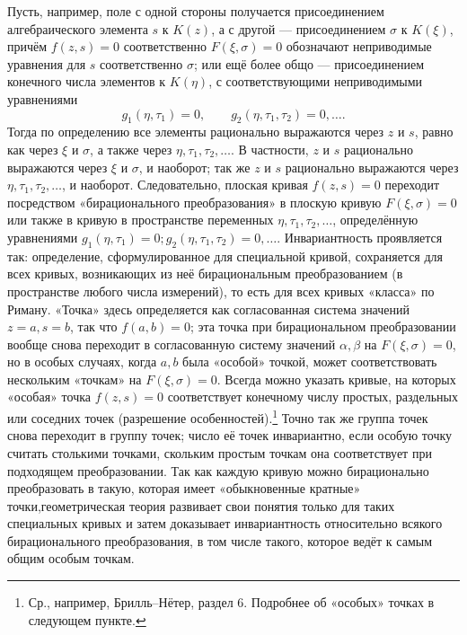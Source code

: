\documentclass[11pt]{article}
\begin{document}
Пусть, например, поле с одной стороны получается присоединением алгебраического элемента \(s\) к \(K(z)\), а с другой --- присоединением \(\sigma\) к \(K(\xi)\), причём \(f(z,s)=0\) соответственно \(F(\xi,\sigma)=0\) обозначают неприводимые уравнения для \(s\) соответственно \(\sigma\); или ещё более общо --- присоединением конечного числа элементов к \(K(\eta)\), с соответствующими неприводимыми уравнениями
\[
g_1(\eta,\tau_1)=0,\qquad g_2(\eta,\tau_1,\tau_2)=0,\ldots .
\]
Тогда по определению все элементы рационально выражаются через \(z\) и \(s\), равно как через \(\xi\) и \(\sigma\), а также через \(\eta,\tau_1,\tau_2,\ldots\). В частности, \(z\) и \(s\) рационально выражаются через \(\xi\) и \(\sigma\), и наоборот; так же \(z\) и \(s\) рационально выражаются через \(\eta,\tau_1,\tau_2,\ldots\), и наоборот. Следовательно, плоская кривая \(f(z,s)=0\) переходит посредством «бирационального преобразования» в плоскую кривую \(F(\xi,\sigma)=0\) или также в кривую в пространстве переменных \(\eta,\tau_1,\tau_2,\ldots\), определённую уравнениями \(g_1(\eta,\tau_1)=0; g_2(\eta,\tau_1,\tau_2)=0,\ldots\). Инвариантность проявляется так: определение, сформулированное для специальной кривой, сохраняется для всех кривых, возникающих из неё бирациональным преобразованием (в пространстве любого числа измерений), то есть для всех кривых «класса» по Риману. «Точка» здесь определяется как согласованная система значений \(z=a,s=b\), так что \(f(a,b)=0\); эта точка при бирациональном преобразовании вообще снова переходит в согласованную систему значений \(\alpha,\beta\) на \(F(\xi,\sigma)=0\), но в особых случаях, когда \(a,b\) была «особой» точкой, может соответствовать нескольким «точкам» на \(F(\xi,\sigma)=0\). Всегда можно указать кривые, на которых «особая» точка \(f(z,s)=0\) соответствует конечному числу простых, раздельных или соседних точек (разрешение особенностей).\footnote{Ср., например, Брилль--Нётер, раздел 6. Подробнее об «особых» точках в следующем пункте.} Точно так же группа точек снова переходит в группу точек; число её точек инвариантно, если особую точку считать столькими точками, скольким простым точкам она соответствует при подходящем преобразовании. Так как каждую кривую можно бирационально преобразовать в такую, которая имеет «обыкновенные кратные» точки,\footnotemark[\value{footnote}] геометрическая теория развивает свои понятия только для таких специальных кривых и затем доказывает инвариантность относительно всякого бирационального преобразования, в том числе такого, которое ведёт к самым общим особым точкам.
\end{document}
